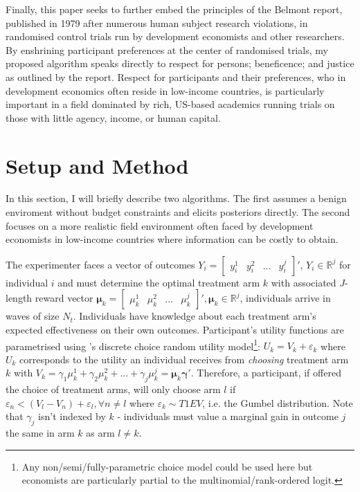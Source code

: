 \documentclass[twoside,11pt]{article}
\begin{document}
Finally, this paper seeks to further embed the principles of the Belmont report, 
published in 1979 after numerous human subject research violations, in randomised 
control trials run by development economists and other researchers. By enshrining 
participant preferences at the center of randomised trials, my proposed algorithm 
speaks directly to respect for persons; beneficence; and justice as outlined by 
the report. Respect for participants and their preferences, who in development 
economics often reside in low-income countries, is particularly important in 
a field dominated by rich, US-based academics \citep{stansbury} running trials on those with 
little agency, income, or human capital.

\section{Setup and Method}

In this section, I will briefly describe two algorithms. The first assumes a benign 
enviroment without budget constraints and elicits posteriors directly. The second focuses on a more 
realistic field environment often faced by development economists in low-income
countries where information can be costly to obtain.

The experimenter faces a vector of outcomes $Y_{i} = \begin{bmatrix}
    y^1_{i} & y^2_{i} & ... & y^j_{i}
\end{bmatrix}'$, $Y_i \in \mathbb{R}^j$ for individual $i$ and must determine 
the optimal treatment 
arm $k$ with associated $J$-length reward vector $\bm{\mu}_k = \begin{bmatrix}
    \mu^1_k & \mu^2_k & ... & \mu^j_k
\end{bmatrix}', \bm{\mu}_k \in \mathbb{R}^j$, individuals arrive in waves of size
$N_t$. Individuals have knowledge about each treatment arm's 
expected effectiveness on their own outcomes. Participant's
 utility functions are parametrised using \cite{mcfadden}'s discrete 
choice random utility model\footnote{Any non/semi/fully-parametric choice model could be used here 
but economists are particularly partial to the multinomial/rank-ordered logit.}: $U_k = V_k + \varepsilon_k$ 
where $U_k$  corresponds to the utility an individual receives from \emph{choosing} treatment arm $k$ 
with $V_k = \gamma_1 \mu_k^1 + \gamma_2 \mu_k^2 + ... + \gamma_j \mu_k^j = \bm{\mu}_k \bm{\gamma}'$. 
Therefore, a participant, if offered 
the choice of treatment arms, will only choose arm $l$ if $\varepsilon_n < (V_l - 
V_n) + \varepsilon_l, \forall n \neq l$ where $\varepsilon_k \sim T1EV$, i.e. the 
Gumbel distribution. Note that 
$\gamma_j$ isn't indexed by $k$ - individuals must value a marginal gain in 
outcome $j$ the same in arm $k$ as arm $l \neq k$.
\end{document}
